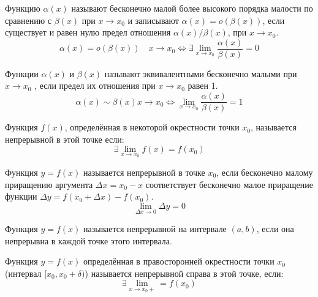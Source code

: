 \begin{definition} \label{def:42}
    Функцию $\alpha(x)$ называют бесконечно малой более высокого порядка малости по сравнению с $\beta(x)$ при $x \to x_0$ и записывают $\alpha(x) = o(\beta(x))$, если существует и равен нулю предел отношения $\alpha(x)/\beta(x)$, при $x \to x_0$. \[
        \alpha(x) = o(\beta(x)) \quad x \to x_0 \iff \exists \lim_{x \to x_0} \frac{\alpha(x)}{\beta(x)} = 0
    \]
\end{definition}


\begin{definition} \label{def:44}
    Функции $\alpha(x)$ и $\beta(x)$ называют эквивалентными бесконечно малыми при $x \to x_0$ , если предел их отношения при $x \to x_0$ равен 1. \[
        \alpha(x) \sim \beta(x) x \to x_0 \iff \lim_{x \to x_0} \frac{\alpha(x)}{\beta(x)} = 1
    \]
\end{definition}


\begin{definition} \label{def:50}
    Функция $f(x)$, определённая в некоторой окрестности точки $x_0$, называется непрерывной в этой точке если: \[
        \exists \lim_{x \to x_0} f(x) = f(x_0)
    \]
\end{definition}


\begin{definition} \label{def:51}
    Функция $y = f(x)$ называется непрерывной в точке $x_0$, если бесконечно малому приращению аргумента $\Delta x = x_0 - x$  соответствует бесконечно малое приращение функции $\Delta y = f(x_0 + \Delta x) - f(x_0)$. \[
        \lim_{\Delta x \to 0} \Delta y = 0
    \] 
\end{definition}


\begin{definition} \label{def:54}
    Функция $y = f(x)$ называется непрерывной на интервале $(a, b)$, если она непрерывна в каждой точке этого интервала.
\end{definition}


\begin{definition}
    Функция $y = f(x)$ определённая в правосторонней окрестности точки $x_0$ (интервал $[x_0, x_0 + \delta)$) называется непрерывной справа в этой точке, если: \[
        \exists \lim_{x \to x_0+} = f(x_0)
    \] 
\end{definition}


